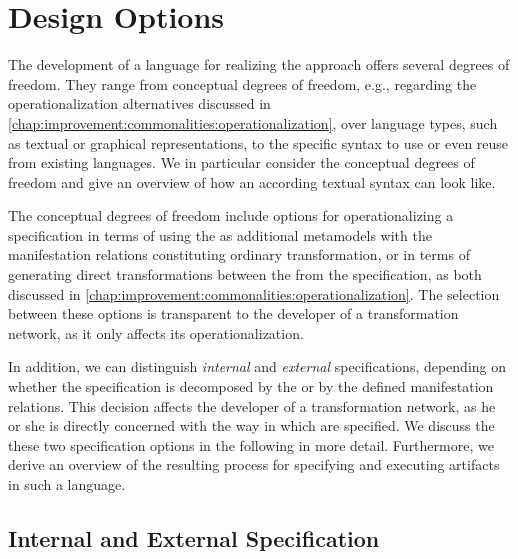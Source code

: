\section{Design Options}

The development of a language for realizing the \commonalities approach offers several degrees of freedom.
They range from conceptual degrees of freedom, e.g., regarding the operationalization alternatives discussed in \autoref{chap:improvement:commonalities:operationalization}, over language types, such as textual or graphical representations, to the specific syntax to use or even reuse from existing languages.
We in particular consider the conceptual degrees of freedom and give an overview of how an according textual syntax can look like.

The conceptual degrees of freedom include options for operationalizing a specification in terms of using the \conceptmetamodels as additional metamodels with the manifestation relations constituting ordinary transformation, or in terms of generating direct transformations between the \concretemetamodels from the \commonalities specification, as both discussed in \autoref{chap:improvement:commonalities:operationalization}.
The selection between these options is transparent to the developer of a transformation network, as it only affects its operationalization.

In addition, we can distinguish \emph{internal} and \emph{external} specifications, depending on whether the specification is decomposed by the \commonalities or by the defined manifestation relations.
This decision affects the developer of a transformation network, as he or she is directly concerned with the way in which \commonalities are specified.
We discuss the these two specification options in the following in more detail.
Furthermore, we derive an overview of the resulting process for specifying and executing artifacts in such a language.


\subsection{Internal and External Specification}
\label{chap:language:design:internal_external}

